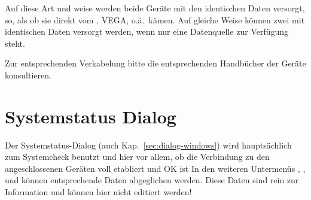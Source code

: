 %



Auf diese Art und weise werden beide Geräte mit den identischen Daten versorgt, so, als ob sie direkt vom \fl, VEGA, o.ä.\ kämen. 
Auf gleiche Weise können zwei \al mit identischen Daten versorgt werden, wenn nur eine Datenquelle zur Verfügung steht.

Zur entsprechenden Verkabelung bitte die entsprechenden Handbücher der Geräte konsultieren.

\section{Systemstatus Dialog}\label{sec:system-status-dialog}

Der Systemstatus-Dialog (auch Kap.~\ref{sec:dialog-windows}) wird hauptsächlich zum Systemcheck benutzt und hier vor allem, ob die Verbindung zu den angeschlossenen Geräten voll etabliert und OK ist
 In den weiteren Untermenüs , ,  und  können entsprechende Daten abgeglichen werden. Diese Daten sind rein zur Information und können hier nicht editiert werden! 

